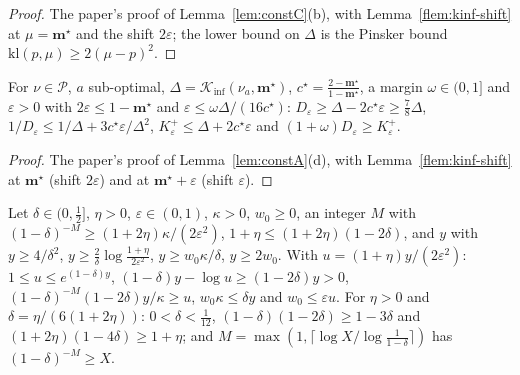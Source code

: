 \documentclass[11pt]{article}
\newcommand{\Kinf}{\mathcal K_{\inf}}
\newcommand{\cP}{\mathcal P}
\begin{document}
\begin{proof}
The paper's proof of Lemma~\ref{lem:constC}(b), with Lemma~\ref{flem:kinf-shift} at $\mu=\mathbf m^\star$ and the shift
$2\varepsilon$; the lower bound on $\Delta$ is the Pinsker bound $\mathrm{kl}(p,\mu)\ge2(\mu-p)^2$.
\end{proof}

\begin{lemma}[the estimates of $\Kinf(\nu_a,\mathbf m^\star)$ when $x>1$]\label{flem:constA-d}
For $\nu\in\cP$, $a$ sub-optimal, $\Delta=\Kinf(\nu_a,\mathbf m^\star)$, $c^\star=\frac{2-\mathbf m^\star}{1-\mathbf m^\star}$, a margin
$\omega\in(0,1]$ and $\varepsilon>0$ with $2\varepsilon\le1-\mathbf m^\star$ and $\varepsilon\le\omega\Delta/(16c^\star)$:
$D_\varepsilon\ge\Delta-2c^\star\varepsilon\ge\frac78\Delta$, $1/D_\varepsilon\le1/\Delta+3c^\star\varepsilon/\Delta^2$,
$K^+_\varepsilon\le\Delta+2c^\star\varepsilon$ and $(1+\omega)D_\varepsilon\ge K^+_\varepsilon$.
\end{lemma}

\begin{proof}
The paper's proof of Lemma~\ref{lem:constA}(d), with Lemma~\ref{flem:kinf-shift} at $\mathbf m^\star$ (shift $2\varepsilon$) and at
$\mathbf m^\star+\varepsilon$ (shift $\varepsilon$).
\end{proof}

\begin{lemma}[what ``$\ell$ large'' guarantees when $x=1$]\label{flem:constC-a}
Let $\delta\in(0,\frac12]$, $\eta>0$, $\varepsilon\in(0,1)$, $\kappa>0$, $w_0\ge0$, an integer $M$ with
$(1-\delta)^{-M}\ge(1+2\eta)\kappa/(2\varepsilon^2)$, $1+\eta\le(1+2\eta)(1-2\delta)$, and $y$ with $y\ge4/\delta^2$,
$y\ge\frac2\delta\log\frac{1+\eta}{2\varepsilon^2}$, $y\ge w_0\kappa/\delta$, $y\ge2w_0$. With $u=(1+\eta)y/(2\varepsilon^2)$:
$1\le u\le e^{(1-\delta)y}$, $(1-\delta)y-\log u\ge(1-2\delta)y>0$, $(1-\delta)^{-M}(1-2\delta)y/\kappa\ge u$,
$w_0\kappa\le\delta y$ and $w_0\le\varepsilon u$. For $\eta>0$ and $\delta=\eta/(6(1+2\eta))$: $0<\delta<\frac1{12}$,
$(1-\delta)(1-2\delta)\ge1-3\delta$ and $(1+2\eta)(1-4\delta)\ge1+\eta$; and
$M=\max(1,\lceil\log X/\log\frac1{1-\delta}\rceil)$ has $(1-\delta)^{-M}\ge X$.
\end{lemma}
\end{document}

